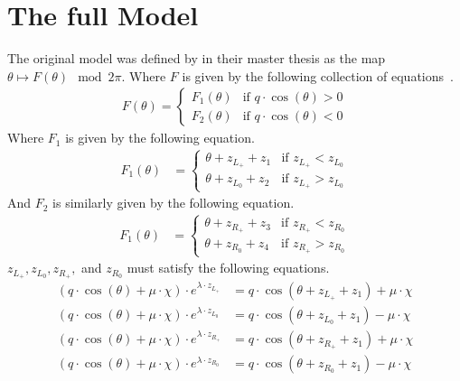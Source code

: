\section{The full Model}

The original model was defined by  in their master thesis as the map $\theta \mapsto F(\theta) \mod 2 \pi$.
Where $F$ is given by the following collection of equations~\cite{akyuz2022}.
\begin{align}
    F(\theta) = \begin{cases}
        F_1(\theta) & \text{if } q \cdot \cos(\theta) > 0 \\
        F_2(\theta) & \text{if } q \cdot \cos(\theta) < 0
    \end{cases}
\end{align}
Where $F_1$ is given by the following equation.
\begin{align}
    F_1(\theta) & = \begin{cases}
        \theta + z_{L_+} + z_1 & \text{if } z_{L_+} < z_{L_0} \\
        \theta + z_{L_0} + z_2 & \text{if } z_{L_+} > z_{L_0}
    \end{cases}
\end{align}
And $F_2$ is similarly given by the following equation.
\begin{align}
    F_1(\theta) & = \begin{cases}
        \theta + z_{R_+} + z_3 & \text{if } z_{R_+} < z_{R_0} \\
        \theta + z_{R_0} + z_4 & \text{if } z_{R_+} > z_{R_0}
    \end{cases}
\end{align}
$z_{L_+}, z_{L_0}, z_{R_+},$ and $z_{R_0}$ must satisfy the following equations.
\begin{subequations}
\begin{align}
    (q \cdot \cos(\theta) + \mu \cdot \chi) \cdot e^{\lambda \cdot z_{L_+}}
    & = q \cdot \cos(\theta + z_{L_+} + z_1) + \mu \cdot \chi \\
    (q \cdot \cos(\theta) + \mu \cdot \chi) \cdot e^{\lambda \cdot z_{L_0}}
    & = q \cdot \cos(\theta + z_{L_0} + z_1) - \mu \cdot \chi \\
    (q \cdot \cos(\theta) + \mu \cdot \chi) \cdot e^{\lambda \cdot z_{R_+}}
    & = q \cdot \cos(\theta + z_{R_+} + z_1) + \mu \cdot \chi \\
    (q \cdot \cos(\theta) + \mu \cdot \chi) \cdot e^{\lambda \cdot z_{R_0}}
    & = q \cdot \cos(\theta + z_{R_0} + z_1) - \mu \cdot \chi
\end{align}
\end{subequations}
